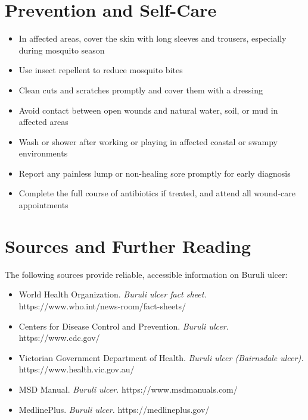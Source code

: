 \section*{Prevention and Self-Care}
\begin{itemize}
    \item In affected areas, cover the skin with long sleeves and trousers, especially during mosquito season
    \item Use insect repellent to reduce mosquito bites
    \item Clean cuts and scratches promptly and cover them with a dressing
    \item Avoid contact between open wounds and natural water, soil, or mud in affected areas
    \item Wash or shower after working or playing in affected coastal or swampy environments
    \item Report any painless lump or non-healing sore promptly for early diagnosis
    \item Complete the full course of antibiotics if treated, and attend all wound-care appointments
\end{itemize}

\section*{Sources and Further Reading}
The following sources provide reliable, accessible information on Buruli ulcer:
\begin{itemize}
    \item World Health Organization. \textit{Buruli ulcer fact sheet.} https://www.who.int/news-room/fact-sheets/
    \item Centers for Disease Control and Prevention. \textit{Buruli ulcer.} https://www.cdc.gov/
    \item Victorian Government Department of Health. \textit{Buruli ulcer (Bairnsdale ulcer).} https://www.health.vic.gov.au/
    \item MSD Manual. \textit{Buruli ulcer.} https://www.msdmanuals.com/
    \item MedlinePlus. \textit{Buruli ulcer.} https://medlineplus.gov/
\end{itemize}
